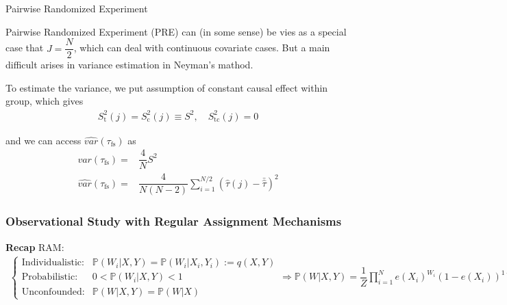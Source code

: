\begin{point}
    Pairwise Randomized Experiment
\end{point}

Pairwise Randomized Experiment (PRE) can (in some sense) be vies as a special case that $ J=\dfrac{N}{2} $, which can deal with continuous covariate cases. But a main difficult arises in variance estimation in Neyman's mathod. 

To estimate the variance, we put assumption of constant causal effect within group, which gives
\begin{align}
     S^2_\mathrm{t}(j)=S^2_\mathrm{c}(j)\equiv S^2,\quad S^2_\mathrm{tc}(j)=0 
\end{align}

and we can access $ \hat{var}(\tau_\mathrm{fs} ) $ as
\begin{align}
    var(\tau_\mathrm{fs} )=&\dfrac{4}{N}S^2\\
    \hat{var}(\tau_\mathrm{fs} )=&\dfrac{4}{N(N-2)}\sum_{i=1}^{N/2}\left(\hat{\tau}(j)-\bar{\hat{\tau}}\right)^2
\end{align}

\subsubsection{Observational Study with Regular Assignment Mechanisms}
\textbf{Recap} RAM:
\begin{align}
    \begin{cases}
        \text{Individualistic:}&\mathbb{P}\left( W_i|X,Y \right)= \mathbb{P}\left( W_i|X_i,Y_i \right) := q(X,Y)\\
        \text{Probabilistic:}&0<\mathbb{P}\left( W_i|X,Y \right)<1\\
        \text{Unconfounded:}&\mathbb{P}\left( W|X,Y \right)=\mathbb{P}\left( W|X \right)  
    \end{cases} \Rightarrow \mathbb{P}\left( W|X,Y \right)=\dfrac{1}{Z}\prod_{i=1}^N e(X_i)^{W_i}(1-e(X_i))^{1-W_i} 
\end{align}

    
